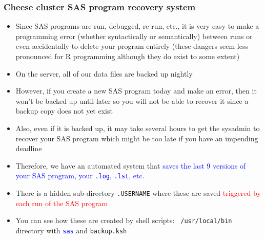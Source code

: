 \documentclass[11pt,pdftex,dvipsnames,usenames,helvetica]{beamer}
\begin{document}
\begin{frame}[fragile]
\frametitle{Cheese cluster SAS program recovery system}
\begin{itemize}
\item Since SAS programs are run, debugged, re-run, etc., it is very
  easy to make a programming error (whether syntactically or
  semantically) between runs or even accidentally to delete your
  program entirely (these dangers seem less pronounced for R
  programming although they do exist to some extent)
\item On the server, all of our data files are backed up nightly
\item However, if you create a new SAS program today and make an error,
  then it won't be backed up until later so you will not be able to
  recover it since a backup copy does not yet exist
\item Also, even if it is backed up, it may take several hours to
get the sysadmin to recover your SAS program which might be too late
if you have an impending deadline
\item Therefore, we have an automated system that 
\textcolor{blue}{saves the last 9 versions of
your SAS program, your {\tt .log}, {\tt .lst}, etc.}
\item There is a hidden sub-directory {\tt .USERNAME} where
these are saved \textcolor{red}{triggered by each run
of the SAS program}
\item You can see how these are created by shell scripts: {\tt
    /usr/local/bin} directory with 
\textcolor{blue}{\tt sas} and {\tt backup.ksh}
\end{itemize}
\end{frame}
\end{document}
